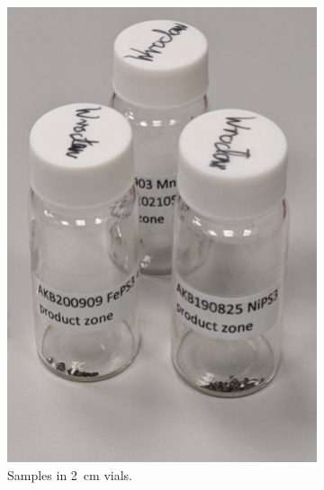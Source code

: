 \documentclass[
	oneside,
	parskip=half,
	a4paper,
]{scrbook}
\begin{document}
\begin{figure}
	\centering
	\begin{subfigure}[t]{.25\textwidth}
		\vskip 0pt
		\includegraphics[width=\textwidth]{../../photos/bulk_sample.jpg}
		\caption{Samples in \SI{2}{cm} vials.}
		\label{fig:samples_vials}
	\end{subfigure}
	\begin{subfigure}[t]{.25\textwidth}
		\vskip 0pt

\end{subfigure}
\end{figure}
\end{document}
